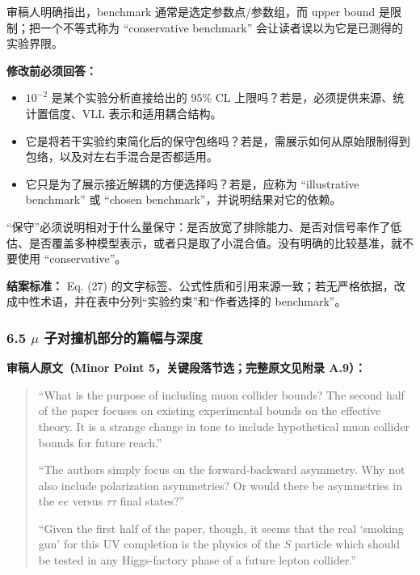 \documentclass[
  chinese,
  UTF8]{ctexart}
\providecommand{\tightlist}{%
  \setlength{\itemsep}{0pt}\setlength{\parskip}{0pt}}
\begin{document}
审稿人明确指出，benchmark 通常是选定参数点/参数组，而 upper bound
是限制；把一个不等式称为 ``conservative benchmark''
会让读者误以为它是已测得的实验界限。

\textbf{修改前必须回答：}

\begin{itemize}
\tightlist
\item
  \(10^{-2}\) 是某个实验分析直接给出的 95\% CL
  上限吗？若是，必须提供来源、统计置信度、VLL 表示和适用耦合结构。
\item
  它是将若干实验约束简化后的保守包络吗？若是，需展示如何从原始限制得到包络，以及对左右手混合是否都适用。
\item
  它只是为了展示接近解耦的方便选择吗？若是，应称为 ``illustrative
  benchmark'' 或 ``chosen benchmark''，并说明结果对它的依赖。
\end{itemize}

``保守''必须说明相对于什么量保守：是否放宽了排除能力、是否对信号率作了低估、是否覆盖多种模型表示，或者只是取了小混合值。没有明确的比较基准，就不要使用
``conservative''。

\textbf{结案标准：} Eq. (27)
的文字标签、公式性质和引用来源一致；若无严格依据，改成中性术语，并在表中分列``实验约束''和``作者选择的
benchmark''。

\subsubsection{\texorpdfstring{6.5 \ensuremath{\mu}
子对撞机部分的篇幅与深度}{6.5  子对撞机部分的篇幅与深度}}\label{ux5b50ux5bf9ux649eux673aux90e8ux5206ux7684ux7bc7ux5e45ux4e0eux6df1ux5ea6}

\textbf{审稿人原文（Minor Point 5，关键段落节选；完整原文见附录 A.9）：}

\begin{quote}
``What is the purpose of including muon collider bounds? The second half
of the paper focuses on existing experimental bounds on the effective
theory. It is a strange change in tone to include hypothetical muon
collider bounds for future reach.''

``The authors simply focus on the forward-backward asymmetry. Why not
also include polarization asymmetries? Or would there be asymmetries in
the \(ee\) versus \(\tau\tau\) final states?''

``Given the first half of the paper, though, it seems that the real
`smoking gun' for this UV completion is the physics of the \(S\)
particle which should be tested in any Higgs-factory phase of a future
lepton collider.''
\end{quote}
\end{document}
